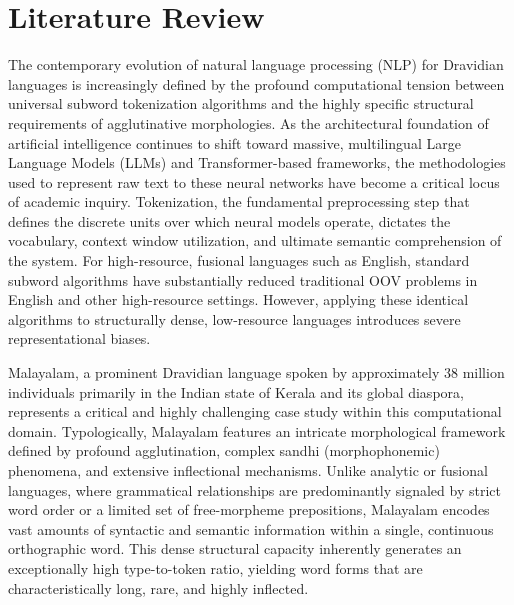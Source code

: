 \documentclass[12pt]{article}
\begin{document}
\newpage

\section{Literature Review}
The contemporary evolution of natural language processing (NLP) for Dravidian languages is increasingly defined by the profound computational tension between universal subword tokenization algorithms and the highly specific structural requirements of agglutinative morphologies. As the architectural foundation of artificial intelligence continues to shift toward massive, multilingual Large Language Models (LLMs) and Transformer-based frameworks, the methodologies used to represent raw text to these neural networks have become a critical locus of academic inquiry. Tokenization, the fundamental preprocessing step that defines the discrete units over which neural models operate, dictates the vocabulary, context window utilization, and ultimate semantic comprehension of the system. For high-resource, fusional languages such as English, standard subword algorithms have substantially reduced traditional OOV problems in English and other high-resource settings.\cite{sennrich-etal-2016-neural} However, applying these identical algorithms to structurally dense, low-resource languages introduces severe representational biases.

Malayalam, a prominent Dravidian language spoken by approximately 38 million individuals primarily in the Indian state of Kerala and its global diaspora, represents a critical and highly challenging case study within this computational domain. Typologically, Malayalam features an intricate morphological framework defined by profound agglutination, complex sandhi (morphophonemic) phenomena, and extensive inflectional mechanisms. Unlike analytic or fusional languages, where grammatical relationships are predominantly signaled by strict word order or a limited set of free-morpheme prepositions, Malayalam encodes vast amounts of syntactic and semantic information within a single, continuous orthographic word. This dense structural capacity inherently generates an exceptionally high type-to-token ratio, yielding word forms that are characteristically long, rare, and highly inflected.\cite{thottingal2019mlmorph}\cite{devadath2014sandhi}
\end{document}
